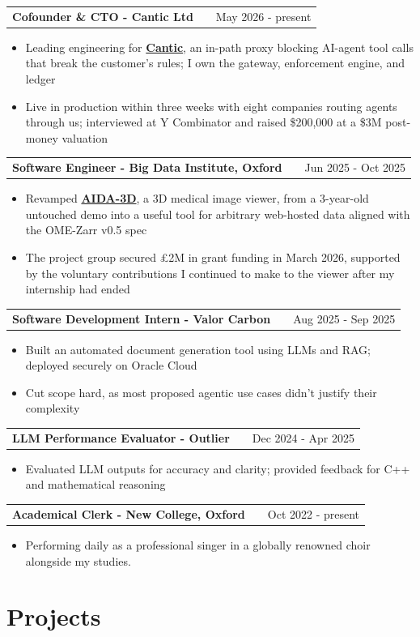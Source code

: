 \documentclass[a4paper,10pt]{article}
\makeatletter
\newenvironment{joblong}[2]
    {
    \begin{tabularx}{\linewidth}{@{}l X r@{}}
    \textbf{#1} & \hfill &  #2 \\[2pt]
    \end{tabularx}
    \begin{minipage}[t]{\linewidth}
    \begin{itemize}[nosep,after=\strut, leftmargin=1em, itemsep=1pt,label=--]
    }
    {
    \end{itemize}
    \end{minipage}
    \par
    }
\makeatother
\begin{document}
\begin{joblong}{Cofounder \& CTO - Cantic Ltd}{May 2026 - present}
\item Leading engineering for \href{https://cantic.ai}{\textbf{Cantic}}, an in-path proxy blocking AI-agent tool calls that break the customer's rules; I own the gateway, enforcement engine, and ledger
\item Live in production within three weeks with eight companies routing agents through us; interviewed at Y Combinator and raised \$200{,}000 at a \$3M post-money valuation
\end{joblong}
\begin{joblong}{Software Engineer - Big Data Institute, Oxford}{Jun 2025 - Oct 2025}
\item Revamped \href{http://141.147.64.20:3000/zarr}{\textbf{AIDA-3D}}, a 3D medical image viewer, from a 3-year-old untouched demo into a useful tool for arbitrary web-hosted data aligned with the OME-Zarr v0.5 spec
\item The project group secured \pounds2M in grant funding in March 2026, supported by the voluntary contributions I continued to make to the viewer after my internship had ended
\end{joblong}
\begin{joblong}{Software Development Intern - Valor Carbon}{Aug 2025 - Sep 2025}
\item Built an automated document generation tool using LLMs and RAG; deployed securely on Oracle Cloud
\item Cut scope hard, as most proposed agentic use cases didn't justify their complexity
\end{joblong}
\begin{joblong}{LLM Performance Evaluator - Outlier}{Dec 2024 - Apr 2025}
\item Evaluated LLM outputs for accuracy and clarity; provided feedback for C++ and mathematical reasoning
\end{joblong}
\begin{joblong}{Academical Clerk - New College, Oxford}{Oct 2022 - present}
\item Performing daily as a professional singer in a globally renowned choir alongside my studies.
\end{joblong}

\section{Projects}
\end{document}
